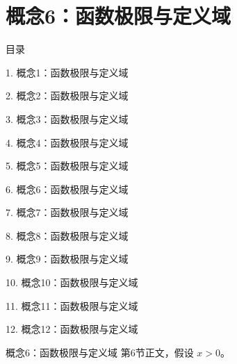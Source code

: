 \documentclass[aspectratio=169,10pt,fontset=fandol]{ctexbeamer}
\begin{document}
\section{概念6：函数极限与定义域}
\begin{frame}[t,fragile]{目录}
\small
{\color{black}\small 1. 概念1：函数极限与定义域\par}\vspace{0.22em}
{\color{black}\small 2. 概念2：函数极限与定义域\par}\vspace{0.22em}
{\color{black}\small 3. 概念3：函数极限与定义域\par}\vspace{0.22em}
{\color{black}\small 4. 概念4：函数极限与定义域\par}\vspace{0.22em}
{\color{black}\small 5. 概念5：函数极限与定义域\par}\vspace{0.22em}
{\color{blue}\small 6. 概念6：函数极限与定义域\par}\vspace{0.22em}
{\color{gray!40}\small 7. 概念7：函数极限与定义域\par}\vspace{0.22em}
{\color{gray!40}\small 8. 概念8：函数极限与定义域\par}\vspace{0.22em}
{\color{gray!40}\small 9. 概念9：函数极限与定义域\par}\vspace{0.22em}
{\color{gray!40}\small 10. 概念10：函数极限与定义域\par}\vspace{0.22em}
{\color{gray!40}\small 11. 概念11：函数极限与定义域\par}\vspace{0.22em}
{\color{gray!40}\small 12. 概念12：函数极限与定义域\par}\vspace{0.22em}
\end{frame}
\begin{frame}[t,fragile]{概念6：函数极限与定义域}
\normalsize
{\normalsize
第6节正文，假设 $x>0$。
}
\end{frame}
\end{document}
